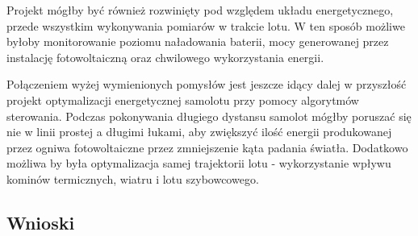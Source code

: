 \documentclass[12pt, a4paper]{article}
\begin{document}
Projekt mógłby być również rozwinięty pod względem układu energetycznego, przede wszystkim wykonywania pomiarów w trakcie lotu. W ten sposób możliwe byłoby monitorowanie poziomu naładowania baterii, mocy generowanej przez instalację fotowoltaiczną oraz chwilowego wykorzystania energii.

Połączeniem wyżej wymienionych pomysłów jest jeszcze idący dalej w przyszłość projekt optymalizacji energetycznej samolotu przy pomocy algorytmów sterowania. Podczas pokonywania długiego dystansu samolot mógłby poruszać się nie w linii prostej a długimi łukami, aby zwiększyć ilość energii produkowanej przez ogniwa fotowoltaiczne przez zmniejszenie kąta padania światła. Dodatkowo możliwa by była optymalizacja samej trajektorii lotu - wykorzystanie wpływu kominów termicznych, wiatru i lotu szybowcowego.

\subsection{Wnioski}
\end{document}
